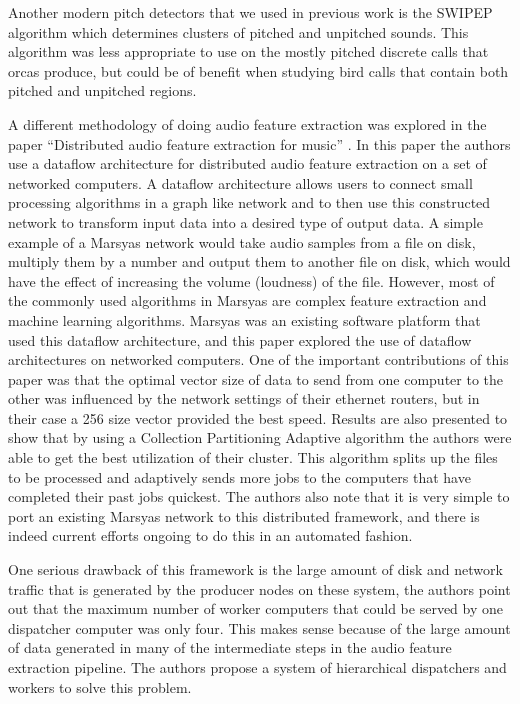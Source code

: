 \documentclass[12pt,oneside]{book}
\begin{document}
Another modern pitch detectors that we used in previous work is the
SWIPEP \cite{camachophd} algorithm which determines clusters of
pitched and unpitched sounds.  This algorithm was less appropriate to
use on the mostly pitched discrete calls that orcas produce, but could
be of benefit when studying bird calls that contain both pitched and
unpitched regions.

A different methodology of doing audio feature extraction was explored
in the paper ``Distributed audio feature extraction for music''
\cite{bray05}.  In this paper the authors use a dataflow architecture
for distributed audio feature extraction on a set of networked
computers.  A dataflow architecture allows users to connect small
processing algorithms in a graph like network and to then use this
constructed network to transform input data into a desired type of
output data.  A simple example of a Marsyas network would take audio
samples from a file on disk, multiply them by a number and output them
to another file on disk, which would have the effect of increasing the
volume (loudness) of the file.  However, most of the commonly used
algorithms in Marsyas are complex feature extraction and machine
learning algorithms.  Marsyas was an existing software platform that
used this dataflow architecture, and this paper explored the use of
dataflow architectures on networked computers.  One of the important
contributions of this paper was that the optimal vector size of data
to send from one computer to the other was influenced by the network
settings of their ethernet routers, but in their case a 256 size
vector provided the best speed.  Results are also presented to show
that by using a Collection Partitioning Adaptive algorithm the authors
were able to get the best utilization of their cluster.  This
algorithm splits up the files to be processed and adaptively sends
more jobs to the computers that have completed their past jobs
quickest.  The authors also note that it is very simple to port an
existing Marsyas network to this distributed framework, and there is
indeed current efforts ongoing to do this in an automated fashion.

One serious drawback of this framework is the large amount of disk and
network traffic that is generated by the producer nodes on these
system, the authors point out that the maximum number of worker
computers that could be served by one dispatcher computer was only
four.  This makes sense because of the large amount of data generated
in many of the intermediate steps in the audio feature extraction
pipeline.  The authors propose a system of hierarchical dispatchers
and workers to solve this problem.
\end{document}
